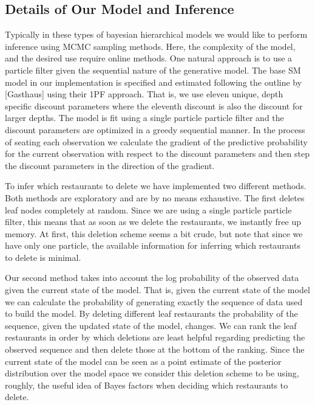 \documentclass{article}
\begin{document}
\subsection{Details of Our Model and Inference}

Typically in these types of bayesian hierarchical models we would like to perform inference using MCMC sampling methods.  Here, the complexity of the model, and the desired use require online methods.  One natural approach is to use a particle filter given the sequential nature of the generative model.  The base SM model in our implementation is specified and estimated following the outline by [Gasthaus] using their 1PF approach.  That is, we use eleven unique, depth specific discount parameters where the eleventh discount is also the discount for larger depths.  The model is fit using a single particle particle filter and the discount parameters are optimized in a greedy sequential manner.  In the process of seating each observation we calculate the gradient of the predictive probability for the current observation with respect to the discount parameters and then step the discount parameters in the direction of the gradient.

To infer which restaurants to delete we have implemented two different methods.  Both methods are exploratory and are by no means exhaustive.  The first deletes leaf nodes completely at random.  Since we are using a single particle particle filter, this means that as soon as we delete the restaurants, we instantly free up memory.  At first, this deletion scheme seems a bit crude, but note that since we have only one particle, the available information for inferring which restaurants to delete is minimal.  

Our second method takes into account the log probability of the observed data given the current state of the model.  That is, given the current state of the model we can calculate the probability of generating exactly the sequence of data used to build the model.  By deleting different leaf restaurants the probability of the sequence, given the updated state of the model, changes.  We can rank the leaf restaurants in order by which deletions are least helpful regarding predicting the observed sequence and then delete those at the bottom of the ranking.  Since the current state of the model can be seen as a point estimate of the posterior distribution over the model space we consider this deletion scheme to be using, roughly, the useful idea of Bayes factors when deciding which restaurants to delete.
\end{document}
